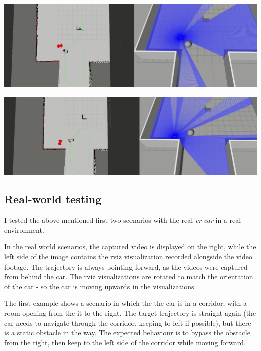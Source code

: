 \begin{center}
	\vspace{0.5cm}
	\includegraphics[width=\textwidth]{figures/raw/local_planner_test_curved_traj_2_static_objects_5.png}

	\vspace{0.5cm}
	\includegraphics[width=\textwidth]{figures/raw/local_planner_test_curved_traj_2_static_objects_6.png}

	\label{local_planner_test_curved_traj_2_static_objects}
\end{center}

\subsection{Real-world testing}
\label{chap:real_world_testing}
I tested the above mentioned first two scenarios with the real \textit{vr-car} in a real environment.

In the real world scenarios, the captured video is displayed on the right, while the left side of the image contains the rviz visualization recorded alongside the video footage. The trajectory is always pointing forward, as the videos were captured from behind the car. The rviz visualizations are rotated to match the orientation of the car - so the car is moving upwards in the visualizations.

The first example shows a scenario in which the the car is in a corridor, with a room opening from the it to the right. The target trajectory is straight again (the car needs to navigate through the corridor, keeping to left if possible), but there is a static obstacle in the way. The expected behaviour is to bypass the obstacle from the right, then keep to the left side of the corridor while moving forward.

